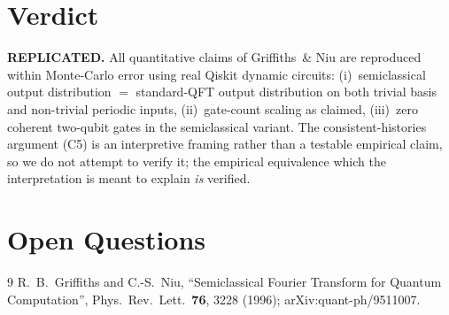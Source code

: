 \documentclass[11pt,letterpaper]{article}
\begin{document}
\section{Verdict}

\textbf{REPLICATED.} All quantitative claims of Griffiths~\& Niu are
reproduced within Monte-Carlo error using real Qiskit dynamic
circuits: (i)~semiclassical output distribution $=$ standard-QFT
output distribution on both trivial basis and non-trivial periodic
inputs, (ii)~gate-count scaling as claimed, (iii)~zero coherent
two-qubit gates in the semiclassical variant. The consistent-histories
argument (C5) is an interpretive framing rather than a testable
empirical claim, so we do not attempt to verify it; the empirical
equivalence which the interpretation is meant to explain \emph{is}
verified.

\section{Open Questions}


\begin{thebibliography}{9}
R.~B.~Griffiths and C.-S.~Niu, ``Semiclassical Fourier Transform for
Quantum Computation'', Phys.\ Rev.\ Lett.\ {\bf 76}, 3228 (1996);
arXiv:quant-ph/9511007.
\end{thebibliography}
\end{document}
